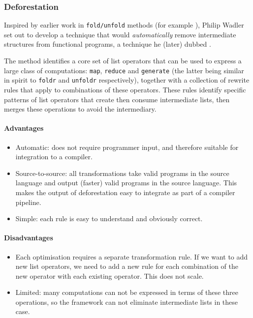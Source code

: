 \subsubsection{Deforestation}

Inspired by earlier work in \texttt{fold/unfold} methods (for example
\citet{Burstall:1977kl}), Philip Wadler set out to develop a technique that
would \emph{automatically} remove intermediate structures from functional
programs, a technique he (later) dubbed 
\cite{Wadler:1981hy,Wadler:1990ix}.

The method identifies a core set of list operators that can be used to express a
large class of computations: \texttt{map}, \texttt{reduce} and
\texttt{generate} (the latter being similar in spirit to \texttt{foldr} and
\texttt{unfoldr} respectively), together with a collection of rewrite rules that
apply to combinations of these operators. These rules identify specific patterns
of list operators that create then consume intermediate lists, then merges these
operations to avoid the intermediary.

\paragraph{Advantages}
\begin{itemize}
    \item Automatic: does not require programmer input, and therefore suitable
        for integration to a compiler.

    \item Source-to-source: all transformations take valid programs in the
        source language and output (faster) valid programs in the source
        language. This makes the output of deforestation easy to integrate as
        part of a compiler pipeline.

    \item Simple: each rule is easy to understand and obviously correct.
\end{itemize}

\paragraph{Disadvantages}
\begin{itemize}
    \item Each optimisation requires a separate transformation rule. If we want
        to add new list operators, we need to add a new rule for each
        combination of the new operator with each existing operator. This does
        not scale.

    \item Limited: many computations can not be expressed in terms of these
        three operations, so the framework can not eliminate intermediate lists
        in these case.
\end{itemize}


